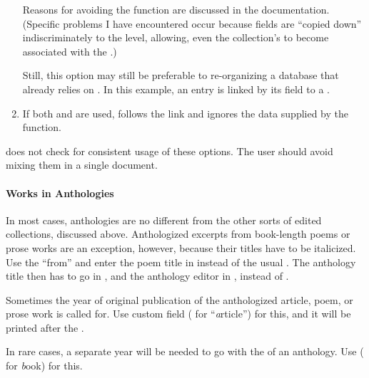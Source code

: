 \documentclass{ltxdockit}[2010/02/12]
\begin{document}
\begin{enumerate}
Reasons for avoiding the \bibtex {} function are discussed in the  documentation. (Specific problems I have encountered occur because  fields are ``copied down'' indiscriminately to the  level, allowing, \eg even the collection's  to become associated with the .)

Still, this option may still be preferable to re-organizing a \bibtex database that already relies on . In this example, an  entry is linked by its  field to a .\autocites[][]{hp:sabean2007from-clan-to-cross}

\item If both  and  are used,  follows the  link and ignores the data supplied by the  function.

\end{enumerate}

 does not check for consistent usage of these options.
The user should avoid mixing them in a single document.




\paragraph{Works in Anthologies}

In most cases, anthologies are no different from the other sorts of edited collections, discussed above.
Anthologized excerpts from book-length poems or prose works are an exception, however, because their titles have to be italicized. Use the  ``from'' and enter the poem title in  instead of the usual . The anthology title then has to go in , and the anthology editor in , instead of .\autocites[][]{pope1980an-essay-on-cri}

Sometimes the year of original publication of the anthologized article, poem, or prose work is called for. Use custom field  ( for ``\emph{a}rticle'') for this, and it will be printed after the .\autocites[][]{reil1811von-der-lebensk}

In rare cases, a separate year will be needed to go with the  of an anthology. Use  ( for \emph{b}ook) for this.\autocites[][]{pope1980an-essay-with-year}
\end{document}
